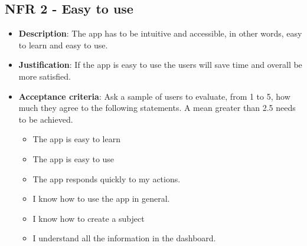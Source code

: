 \subsection*{NFR 2 - Easy to use}
\begin{itemize}
    \item \textbf{Description}: The app has to be intuitive and accessible, in other words, easy to learn and easy to use.
    \item \textbf{Justification}: If the app is easy to use the users will save time and overall be more satisfied.
    \item \textbf{Acceptance criteria}: Ask a sample of users to evaluate, from 1 to 5, how much they agree to the following statements. A mean greater than 2.5 needs to be achieved.
    \begin{itemize}[noitemsep]
        \item The app is easy to learn
        \item The app is easy to use
        \item The app responds quickly to my actions.
        \item I know how to use the app in general.
        \item I know how to create a subject
        \item I understand all the information in the dashboard.
    \end{itemize}
\end{itemize}

